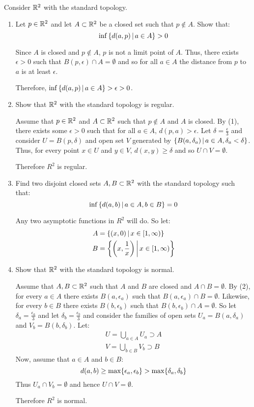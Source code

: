 \documentclass[letterpaper,12pt,fleqn]{article}
\newcommand{\e}{\epsilon}
\renewcommand{\d}{\delta}
\begin{document}
\begin{example}
  Consider \(\mathbb{R}^2\) with the standard topology.

  \begin{enumerate}
  \item Let \(p\in\mathbb{R}^2\) and let \(A\subset\mathbb{R}^2\) be a closed set such that \(p\notin A\).  Show that:
    \[\inf\left\{{d(a,p)}\,\middle|\,{a\in A}\right\}>0\]

    Since \(A\) is closed and \(p\notin A\), \(p\) is not a limit point of \(A\).  Thus, there exists \(\e>0\) such
    that \(B(p,\e)\cap A=\emptyset\) and so for all \(a\in A\) the distance from \(p\) to \(a\) is at least \(\e\).

    Therefore, \(\inf\setb{d(a,p)}{a\in A}>\e>0\).

  \item Show that \(\mathbb{R}^2\) with the standard topology is regular.

    Assume that \(p\in\mathbb{R}^2\) and \(A\subset\mathbb{R}^2\) such that \(p\notin A\) and \(A\) is closed.  By (1), there
    exists some \(\e>0\) such that for all \(a\in A\), \(d(p,a)>\e\).  Let \(\d=\frac{\e}{3}\) and consider
    \(U=B(p,\d)\) and open set \(V\) generated by \(\setb{B(a,\d_a)}{a\in A,\d_a<\d}\).  Thus, for every point
    \(x\in U\) and \(y\in V\), \(d(x,y)\ge\d\) and so \(U\cap V=\emptyset\).

    Therefore \(R^2\) is regular.

  \item Find two disjoint closed sets \(A,B\subset\mathbb{R}^2\) with the standard topology such that:
    \[\inf\left\{{d(a,b)}\,\middle|\,{a\in A,b\in B}\right\}=0\]

    Any two asymptotic functions in \(R^2\) will do.  So let:
    \begin{align*}
      A &= \left\{{(x,0)}\,\middle|\,{x\in[1,\infty)}\right\} \\
      B &= \left\{{\left(x,\frac{1}{x}\right)}\,\middle|\,{x\in[1,\infty)}\right\}
    \end{align*}

  \item Show that \(\mathbb{R}^2\) with the standard topology is normal.

    Assume that \(A,B\subset\mathbb{R}^2\) such that \(A\) and \(B\) are closed and \(A\cap B=\emptyset\).  By (2), for every
    \(a\in A\) there exists \(B(a,\e_a)\) such that \(B(a,\e_a)\cap B=\emptyset\).  Likewise, for every \(b\in B\)
    there exists \(B(b,\e_b)\) such that \(B(b,\e_b)\cap A=\emptyset\).  So let \(\d_a=\frac{\e_a}{3}\) and let
    \(\d_b=\frac{\e_b}{3}\) and consider the families of open sets \(U_a=B(a,\d_a)\) and \(V_b=B(b,\d_b)\).  Let:
    \begin{align*}
      U=\bigcup_{a\in A}U_a\supset A \\
      V=\bigcup_{b\in B}V_b\supset B
    \end{align*}
    Now, assume that \(a\in A\) and \(b\in B\):
    \[d(a,b)\ge\max\set{\e_a,\e_b}>\max\set{\d_a,\d_b}\]
    Thus \(U_a\cap V_b=\emptyset\) and hence \(U\cap V=\emptyset\).

    Therefore \(R^2\) is normal.
  \end{enumerate}
\end{example}
\end{document}
